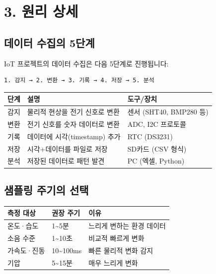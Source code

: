 \documentclass[11pt,a4paper]{article}
\begin{document}
\section*{3. 원리 상세}

\subsection*{데이터 수집의 5단계}

IoT 프로젝트의 데이터 수집은 다음 5단계로 진행됩니다:


\begin{tcolorbox}[formulabox]
\begin{verbatim}
1. 감지 → 2. 변환 → 3. 기록 → 4. 저장 → 5. 분석
\end{verbatim}
\end{tcolorbox}

\begin{center}
\renewcommand{\arraystretch}{1.4}
\begin{tabular}{|p{1.5cm}|p{7.4cm}|p{6.1cm}|}
\hline
\rowcolor{tableheader}
\textbf{단계} & \textbf{설명} & \textbf{도구/장치} \\
\hline
감지 & 물리적 현상을 전기 신호로 변환 & 센서 (SHT40, BMP280 등) \\
\hline
변환 & 전기 신호를 숫자 데이터로 변환 & ADC, I2C 프로토콜 \\
\hline
기록 & 데이터에 시각(timestamp) 추가 & RTC (DS3231) \\
\hline
저장 & 시각+데이터를 파일로 저장 & SD카드 (CSV 형식) \\
\hline
분석 & 저장된 데이터로 패턴 발견 & PC (엑셀, Python) \\
\hline
\end{tabular}
\end{center}

\subsection*{샘플링 주기의 선택}

\begin{center}
\renewcommand{\arraystretch}{1.4}
\begin{tabular}{|p{3.7cm}|p{3.0cm}|p{8.3cm}|}
\hline
\rowcolor{tableheader}
\textbf{측정 대상} & \textbf{권장 주기} & \textbf{이유} \\
\hline
온도·습도 & 1\textasciitilde{}5분 & 느리게 변하는 환경 데이터 \\
\hline
소음 수준 & 1\textasciitilde{}10초 & 비교적 빠르게 변화 \\
\hline
가속도·진동 & 10\textasciitilde{}100ms & 빠른 물리적 변화 감지 \\
\hline
기압 & 5\textasciitilde{}15분 & 매우 느리게 변화 \\
\hline
\end{tabular}
\end{center}
\end{document}
